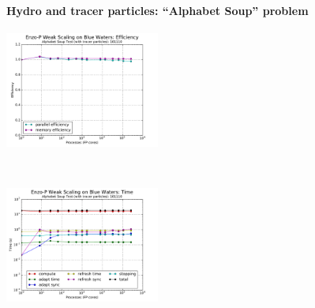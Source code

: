 
\begin{frame}[fragile]
 \secframetitle{\ssScaling}
  \framesubtitle{Hydro and tracer particles: ``Alphabet Soup'' problem}
\begin{center}
  \vspace{-0.1in}
  \begin{minipage}{4.50in}
    \begin{center}
      \begin{minipage}{2in}
    \includegraphics[width=2.0in]{Images/Scaling/scaling-efficiency-161110.pdf}
    \end{minipage} \ 
      \begin{minipage}{2in}
    \includegraphics[width=2.0in]{Images/Scaling/scaling-time-161110.pdf}
    \end{minipage} \\
    \end{center}
  \end{minipage} \\
\end{center}
\end{frame}
